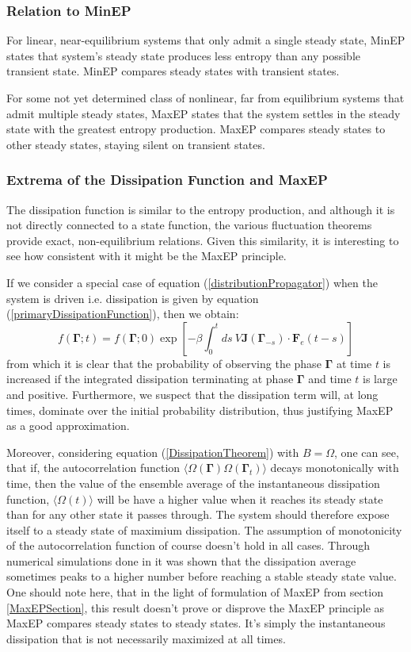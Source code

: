 \documentclass[a4paper,12pt]{article}
\begin{document}
\subsubsection{Relation to MinEP}

For linear, near-equilibrium systems that only admit a single steady state, MinEP states that system's steady state produces less entropy than any possible transient state.
MinEP compares steady states with transient states.

For some not yet determined class of nonlinear, far from equilibrium systems that admit multiple steady states, MaxEP states that the system settles in the steady state with the greatest entropy production. MaxEP compares steady states to other steady states, staying silent on transient states.

\subsubsection{Extrema of the Dissipation Function and MaxEP}
The dissipation function is similar to the entropy production, and although it is not directly connected to a state function, the various fluctuation theorems provide exact, non-equilibrium relations. Given this similarity, it is interesting to see how consistent with it might be the MaxEP principle. 

If we consider a special case of equation (\ref{distributionPropagator}) when the system is driven i.e. dissipation is given by equation (\ref{primaryDissipationFunction}), then we obtain:
\begin{equation}
  f(\bm{\Gamma};t)=f(\bm{\Gamma};0)\exp[-\beta \int_0^t ds\ V\bm{J}(\bm{\Gamma}_{-s})\cdot \bm{F}_e(t-s)]
\end{equation}
from which it is clear that the probability of observing the phase $\bm{\Gamma}$ at time $t$ is increased if the integrated dissipation terminating at phase $\bm{\Gamma}$ and time $t$ is large and positive. Furthermore, we suspect that the dissipation term will, at long times, dominate over the initial probability distribution, thus justifying MaxEP as a good approximation.

Moreover, considering equation (\ref{DissipationTheorem}) with $B=\Omega$, one can see, that if, the autocorrelation function $\langle \Omega(\bm{\Gamma})\Omega(\bm{\Gamma}_t)\rangle$ decays monotonically with time, then the value of the ensemble average of the instantaneous dissipation function, $\langle \Omega(t) \rangle$ will be have a higher value when it reaches its steady state than for any other state it passes through. The system should therefore expose itself to a steady state of maximium dissipation.
The assumption of monotonicity of the autocorrelation function of course doesn't hold in all cases. Through numerical simulations done in \cite{Brookes:2011hu} it was shown that the dissipation average sometimes peaks to a higher number before reaching a stable steady state value. 
One should note here, that in the light of formulation of MaxEP from section \ref{MaxEPSection}, this result doesn't prove or disprove the MaxEP principle as MaxEP compares steady states to steady states.
It's simply the instantaneous dissipation that is not necessarily maximized at all times.
\end{document}
